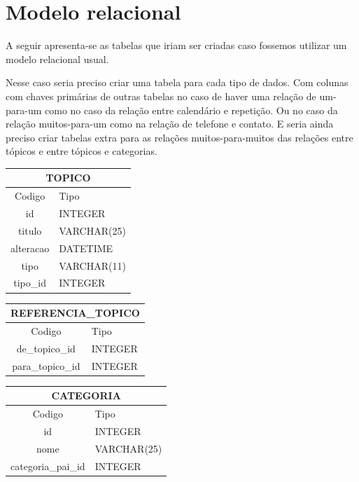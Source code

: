 \documentclass[a4paper,12pt]{article}
\begin{document}
\section{Modelo relacional}

	A seguir apresenta-se as tabelas que iriam ser criadas caso fossemos utilizar um modelo relacional usual.

	Nesse caso seria preciso criar uma tabela para cada tipo de dados. Com colunas com chaves primárias de outras tabelas no caso de haver uma relação de um-para-um como no caso da relação entre calendário e repetição. Ou no caso da relação muitos-para-um como na relação de telefone e contato. E seria ainda preciso criar tabelas extra para as relações muitos-para-muitos das relações entre tópicos e entre tópicos e categorias.

	\begin{multicols}{2}

		\begin{tabular}{|c|l|} \hline
			\multicolumn{2}{|c|}{TOPICO} \\ \hline
			Codigo & Tipo \\ \hline
			id & INTEGER \\
			titulo & VARCHAR(25) \\
			alteracao & DATETIME \\
			tipo & VARCHAR(11) \\
			tipo\_id & INTEGER \\ \hline
		\end{tabular}
		
		\begin{tabular}{|c|l|} \hline
			\multicolumn{2}{|c|}{REFERENCIA\_TOPICO} \\ \hline
			Codigo & Tipo \\ \hline
			de\_topico\_id  & INTEGER \\
			para\_topico\_id & INTEGER \\ \hline
		\end{tabular}
		
		\begin{tabular}{|c|l|} \hline
			\multicolumn{2}{|c|}{CATEGORIA} \\ \hline
			Codigo & Tipo \\ \hline
			id & INTEGER \\
			nome & VARCHAR(25) \\
			categoria\_pai\_id & INTEGER \\ \hline
		\end{tabular}
			

\end{multicols}
\end{document}
